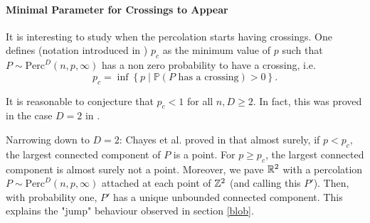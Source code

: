 \paragraph{Minimal Parameter for Crossings to Appear}
It is interesting to study when the percolation starts having crossings.
One defines (notation introduced in \cite{Chayes_1988}) $p_c$ as the minimum value of $p$ such that $P \sim \text{Perc}^D(n,p,\infty)$ has a non zero probability to have a crossing, i.e.
$$p_c = \inf \left\lbrace p \mid \mathbb{P}(P \text{ has a crossing})>0 \right\rbrace .$$

It is reasonable to conjecture that $p_c<1$ for all $n,D \geq 2$. In fact, this was proved in the case $D=2$ in \cite{Chayes_1988}.

Narrowing down to $D=2$:
Chayes et al. proved in \cite{Chayes_1988} that almost surely, if $p<p_c$, the largest connected component of $P$ is a point.
For $p \geq p_c$, the largest connected component is almost surely not a point.
Moreover, we pave $\mathbb{R}^2$ with a percolation $P \sim \text{Perc}^D(n,p,\infty)$ attached at each point of $\mathbb{Z}^2$ (and calling this $P'$).
Then, with probability one, $P'$ has a unique unbounded connected component.
This explains the "jump" behaviour observed in section \ref{blob}.

